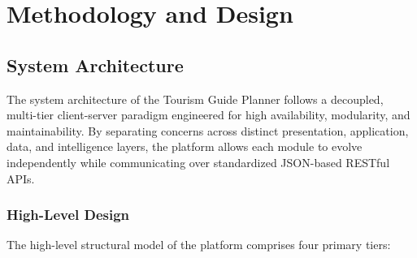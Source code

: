 \documentclass[12pt,a4paper,twoside,openright]{report}
\begin{document}
\chapter{Methodology and Design}

\section{System Architecture}

The system architecture of the Tourism Guide Planner follows a decoupled, multi-tier client-server paradigm engineered for high availability, modularity, and maintainability. By separating concerns across distinct presentation, application, data, and intelligence layers, the platform allows each module to evolve independently while communicating over standardized JSON-based RESTful APIs.

\subsection{High-Level Design}

The high-level structural model of the platform comprises four primary tiers:
\end{document}
